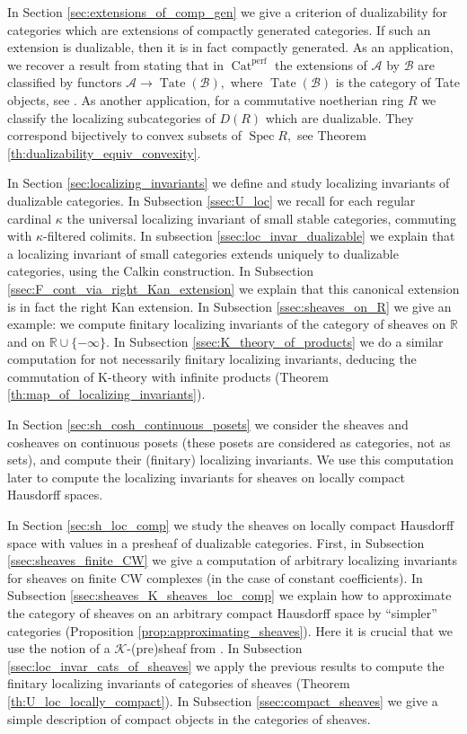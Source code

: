 \documentclass[11pt,leqno]{amsart}
\numberwithin{equation}{section}
\def\R{\mathbb{R}}
\newcommand{\ms}[1]{\mathscr{#1}}
\newcommand{\msK}{\ms{K}}
\newcommand{\Tate}{\operatorname{Tate}}
\newcommand{\Cat}{\operatorname{Cat}}
\newcommand{\cA}{{\mathcal A}}
\newcommand{\cB}{{\mathcal B}}
\newcommand{\perf}{\operatorname{perf}}
\newcommand{\Spec}{\operatorname{Spec}}
\begin{document}
In Section \ref{sec:extensions_of_comp_gen} we give a criterion of dualizability for categories which are extensions of compactly generated categories. If such an extension is dualizable, then it is in fact compactly generated. As an application, we recover a result from \cite[Appendix A]{CDH+20} stating that in $\Cat^{\perf}$ the extensions of $\cA$ by $\cB$ are classified by functors $\cA\to\Tate(\cB),$ where $\Tate(\cB)$ is the category of Tate objects, see \cite{Hen}. As another application, for a commutative noetherian ring $R$ we classify the localizing subcategories of $D(R)$ which are dualizable. They correspond bijectively to convex subsets of $\Spec R,$ see Theorem \ref{th:dualizability_equiv_convexity}.

In Section \ref{sec:localizing_invariants} we define and study localizing invariants of dualizable categories. In Subsection \ref{ssec:U_loc} we recall for each regular cardinal $\kappa$  the universal localizing invariant of small stable categories, commuting with $\kappa$-filtered colimits. In subsection \ref{ssec:loc_invar_dualizable} we explain that a localizing invariant of small categories extends uniquely to dualizable categories, using the Calkin construction. In Subsection \ref{ssec:F_cont_via_right_Kan_extension} we explain that this canonical extension is in fact the right Kan extension. In Subsection \ref{ssec:sheaves_on_R} we give an example: we compute finitary localizing invariants of the category of sheaves on $\R$ and on $\R\cup\{-\infty\}.$ In Subsection \ref{ssec:K_theory_of_products} we do a similar computation for not necessarily finitary localizing invariants, deducing the commutation of K-theory with infinite products (Theorem \ref{th:map_of_localizing_invariants}).

In Section \ref{sec:sh_cosh_continuous_posets} we consider the sheaves and cosheaves on continuous posets (these posets are considered as categories, not as sets), and compute their (finitary) localizing invariants. We use this computation later to compute the localizing invariants for sheaves on locally compact Hausdorff spaces.  

In Section \ref{sec:sh_loc_comp} we study the sheaves on locally compact Hausdorff space with values in a presheaf of dualizable categories. First, in Subsection \ref{ssec:sheaves_finite_CW} we give a computation of arbitrary localizing invariants for sheaves on finite CW complexes (in the case of constant coefficients). In Subsection \ref{ssec:sheaves_K_sheaves_loc_comp} we explain how to approximate the category of sheaves on an arbitrary compact Hausdorff space by ``simpler'' categories (Proposition \ref{prop:approximating_sheaves}). Here it is crucial that we use the notion of a $\msK$-(pre)sheaf from \cite{Lur09}. In Subsection \ref{ssec:loc_invar_cats_of_sheaves} we apply the previous results to compute the finitary localizing invariants of categories of sheaves (Theorem \ref{th:U_loc_locally_compact}). In Subsection \ref{ssec:compact_sheaves} we give a simple description of compact objects in the categories of sheaves.
\end{document}

